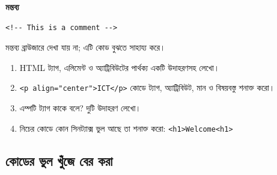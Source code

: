 \par\noindent
\begin{minipage}[t]{.52\linewidth}\vspace{0pt}\small
{\bfseries\color{chFourTeal}মন্তব্য}\par
\begin{verbatim}
<!-- This is a comment -->
\end{verbatim}
\end{minipage}\hfill
\begin{minipage}[t]{.44\linewidth}\vspace{0pt}\small
মন্তব্য ব্রাউজারে দেখা যায় না; এটি কোড বুঝতে সাহায্য করে।
\end{minipage}\par\smallskip





\begin{practicebox}
\begin{enumerate}
\item HTML ট্যাগ, এলিমেন্ট ও অ্যাট্রিবিউটের পার্থক্য একটি উদাহরণসহ লেখো।
\item \texttt{<p align="center">ICT</p>} কোডে ট্যাগ, অ্যাট্রিবিউট, মান ও বিষয়বস্তু শনাক্ত করো।
\item এম্পটি ট্যাগ কাকে বলে? দুটি উদাহরণ লেখো।
\item নিচের কোডে কোন সিনট্যাক্স ভুল আছে তা শনাক্ত করো: \texttt{<h1>Welcome<h1>}
\end{enumerate}
\end{practicebox}


\subsection{কোডের ভুল খুঁজে বের করা}

